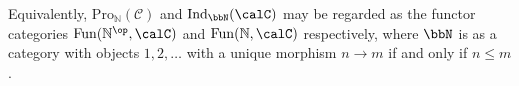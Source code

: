 \begin{definition}
    Equivalently, $\mathrm{Pro}_{\mathbb{N}}(\mathcal{C})$ and $\mathrm{Ind}_{\bbN}(\calC)$ may be regarded as the functor categories $\operatorname{Fun}(\mathbb{N}^{\op}, \calC)$ and $\operatorname{Fun}(\mathbb{N}, \calC)$ respectively, where $\bbN$ is  as a  category with objects $1,2,\ldots$ with a unique morphism $n \to m$ if and only if $n \leq m$.
\end{definition}